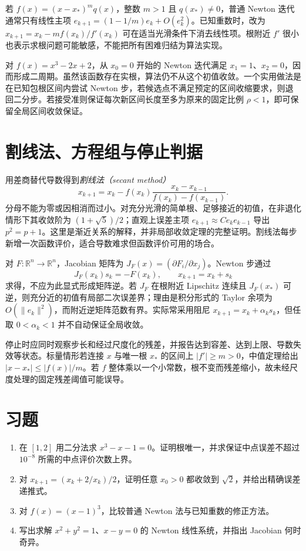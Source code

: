 若 $f(x)=(x-x_*)^m q(x)$，整数 $m>1$ 且 $q(x_*)\ne0$，普通 Newton 迭代通常只有线性主项 $e_{k+1}=(1-1/m)e_k+O(e_k^2)$。已知重数时，改为 $x_{k+1}=x_k-mf(x_k)/f'(x_k)$ 可在适当光滑条件下消去线性项。根附近 $f'$ 很小也表示求根问题可能敏感，不能把所有困难归结为算法实现。

\begin{example}[局部结论不能当作全局结论]
对 $f(x)=x^3-2x+2$，从 $x_0=0$ 开始的 Newton 迭代满足 $x_1=1$、$x_2=0$，因而形成二周期。虽然该函数存在实根，算法仍不从这个初值收敛。一个实用做法是在已知包根区间内尝试 Newton 步，若候选点不满足预定的区间收缩要求，则退回二分步。若接受准则保证每次新区间长度至多为原来的固定比例 $\rho<1$，即可保留全局区间收敛保证。
\end{example}

\section{割线法、方程组与停止判据}
用差商替代导数得到\emph{割线法（secant method）}
\[
 x_{k+1}=x_k-f(x_k)\frac{x_k-x_{k-1}}{f(x_k)-f(x_{k-1})}.
\]
分母不能为零或因相消而过小。对充分光滑的简单根、足够接近的初值，在非退化情形下其收敛阶为 $(1+\sqrt5)/2$；直观上误差主项 $e_{k+1}\approx C e_ke_{k-1}$ 导出 $p^2=p+1$。这里是渐近关系的解释，并非局部收敛定理的完整证明。割线法每步新增一次函数评价，适合导数难求但函数评价可用的场合。

对 $F:\mathbb R^n\to\mathbb R^n$，Jacobian 矩阵为 $J_F(x)=(\partial F_i/\partial x_j)$。Newton 步通过
\[
 J_F(x_k)s_k=-F(x_k),\qquad x_{k+1}=x_k+s_k
\]
求得，不应为此显式形成矩阵逆。若 $J_F$ 在根附近 Lipschitz 连续且 $J_F(x_*)$ 可逆，则充分近的初值有局部二次误差界；理由是积分形式的 Taylor 余项为 $O(\|e_k\|^2)$，而附近逆矩阵范数有界。实际常采用阻尼 $x_{k+1}=x_k+\alpha_ks_k$，但任取 $0<\alpha_k<1$ 并不自动保证全局收敛。

停止时应同时观察步长和经过尺度化的残差，并报告达到容差、达到上限、导数失效等状态。标量情形若连接 $x$ 与唯一根 $x_*$ 的区间上 $|f'|\ge m>0$，中值定理给出 $|x-x_*|\le|f(x)|/m$。若 $f$ 整体乘以一个小常数，根不变而残差缩小，故未经尺度处理的固定残差阈值可能误导。

\section{习题}
\begin{enumerate}[label=\arabic*.]
\item\label{exr:na-root-bisect} 在 $[1,2]$ 用二分法求 $x^3-x-1=0$。证明根唯一，并求保证中点误差不超过 $10^{-8}$ 所需的中点评价次数上界。
\item\label{exr:na-root-fixed} 对 $x_{k+1}=(x_k+2/x_k)/2$，证明任意 $x_0>0$ 都收敛到 $\sqrt2$，并给出精确误差递推式。
\item\label{exr:na-root-multiple} 对 $f(x)=(x-1)^3$，比较普通 Newton 法与已知重数的修正方法。
\item\label{exr:na-root-system} 写出求解 $x^2+y^2=1$、$x-y=0$ 的 Newton 线性系统，并指出 Jacobian 何时奇异。
\end{enumerate}

